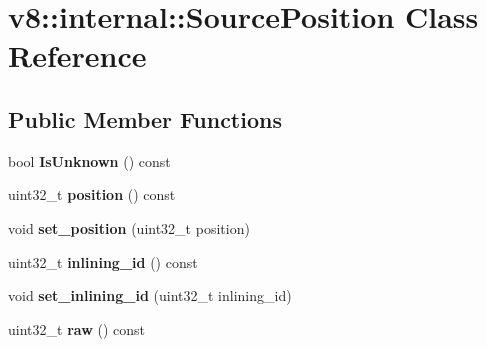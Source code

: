 \hypertarget{classv8_1_1internal_1_1_source_position}{}\section{v8\+:\+:internal\+:\+:Source\+Position Class Reference}
\label{classv8_1_1internal_1_1_source_position}
\subsection*{Public Member Functions}
\begin{DoxyCompactItemize}
\item 
bool {\bfseries Is\+Unknown} () const \hypertarget{classv8_1_1internal_1_1_source_position_a819b05d042a5ec74593dae29e6c115b7}{}\label{classv8_1_1internal_1_1_source_position_a819b05d042a5ec74593dae29e6c115b7}

\item 
uint32\+\_\+t {\bfseries position} () const \hypertarget{classv8_1_1internal_1_1_source_position_ad316d3a4d664b3eea13663a0d26a6815}{}\label{classv8_1_1internal_1_1_source_position_ad316d3a4d664b3eea13663a0d26a6815}

\item 
void {\bfseries set\+\_\+position} (uint32\+\_\+t position)\hypertarget{classv8_1_1internal_1_1_source_position_a2c7bd76ace206f2f1f1d1cc60582ad23}{}\label{classv8_1_1internal_1_1_source_position_a2c7bd76ace206f2f1f1d1cc60582ad23}

\item 
uint32\+\_\+t {\bfseries inlining\+\_\+id} () const \hypertarget{classv8_1_1internal_1_1_source_position_ac9576e9e1c83055ed349e80da0aa9b4c}{}\label{classv8_1_1internal_1_1_source_position_ac9576e9e1c83055ed349e80da0aa9b4c}

\item 
void {\bfseries set\+\_\+inlining\+\_\+id} (uint32\+\_\+t inlining\+\_\+id)\hypertarget{classv8_1_1internal_1_1_source_position_ac93eec2d5d4c0a21f3c10754f8128d1e}{}\label{classv8_1_1internal_1_1_source_position_ac93eec2d5d4c0a21f3c10754f8128d1e}

\item 
uint32\+\_\+t {\bfseries raw} () const \hypertarget{classv8_1_1internal_1_1_source_position_a2b290d09503d7ce37cf9cba58b3b1541}{}\label{classv8_1_1internal_1_1_source_position_a2b290d09503d7ce37cf9cba58b3b1541}

\end{DoxyCompactItemize}
